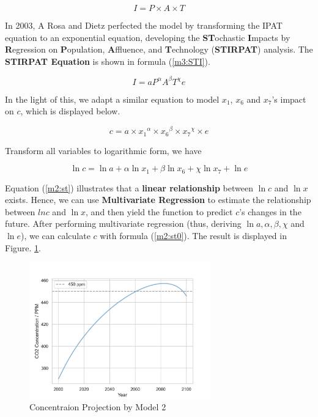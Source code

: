 \documentclass[12pt]{article}
\begin{document}
\begin{equation}
    I = P \times A \times T
\end{equation}

In 2003, A Rosa and Dietz perfected the model by transforming the IPAT equation to an exponential equation, developing the \textbf{ST}ochastic \textbf{I}mpacts by \textbf{R}egression on \textbf{P}opulation, \textbf{A}ffluence, and \textbf{T}echnology (\textbf{STIRPAT}) analysis\cite{STI}. The \textbf{STIRPAT Equation} is shown in formula (\ref{m3:STI}).

\begin{equation}
    \label{m3:STI}
    I = a P^{\alpha} A^{\beta} T^{\chi} e
\end{equation}

In the light of this, we adapt a similar equation to model $x_1$, $x_6$ and $x_7$'s impact on $c$, which is displayed below.

\begin{equation}
    \label{m2:st0}
    c = a \times {x_1}^\alpha \times {x_6}^\beta \times {x_7}^\chi \times e
\end{equation}

Transform all variables to logarithmic form, we have

\begin{equation}
    \label{m2:st}
    \ln c = \ln a + \alpha \ln{x_1} + \beta \ln{x_6} + \chi \ln{x_7} + \ln e
\end{equation}

Equation (\ref{m2:st}) illustrates that a \textbf{linear relationship} between $\ln c$ and $\ln x$ exists. Hence, we can use \textbf{Multivariate Regression} to estimate the relationship between $ln c$ and $\ln x$, and then yield the function to predict $c$'s changes in the future. After performing multivariate regression (thus, deriving $\ln a, \alpha, \beta, \chi$ and $\ln e$), we can calculate $c$ with formula (\ref{m2:st0}). The result is displayed in Figure. \ref{m2:fig}.

\begin{figure}[hbt]
    \centering
    \includegraphics[width = 0.7\textwidth]{fig/STI.png}
    \caption{ Concentraion Projection by Model 2}
    \label{m2:fig}
\end{figure}
\end{document}
